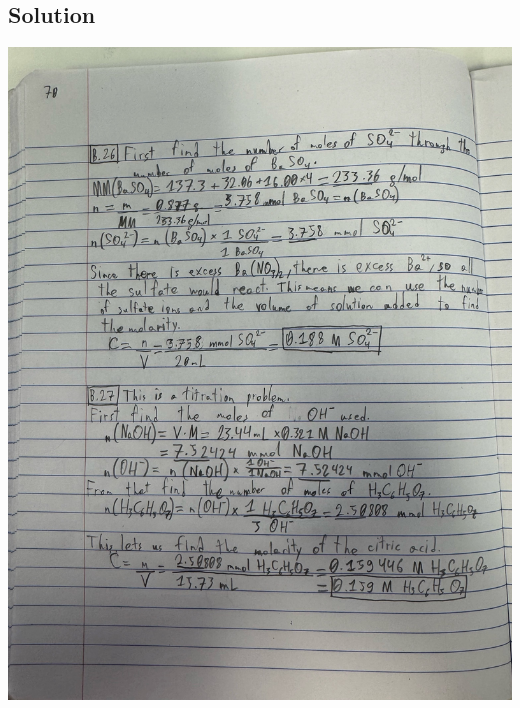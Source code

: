\documentclass[10pt]{article}
\begin{document}
        \subsection{Solution}
            \begin{center}
                \includegraphics[width=\textwidth, trim={5in 7in 1in 28in},clip]{"Answers Images/IMG_6656.jpg"}
            \end{center}

    \pagebreak

    \tableofcontents
\end{document}
